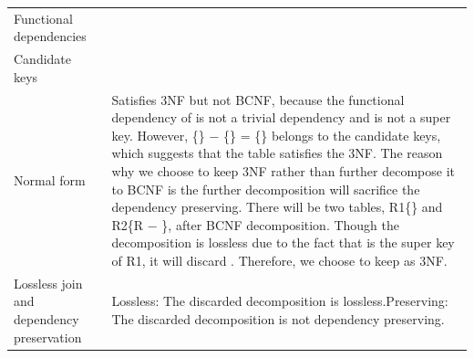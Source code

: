 \begin{xltabular}{\linewidth}{@{}KY@{}}
Functional dependencies & \begin{points}
  \item {}
  \item {}
  \item {}
  \item {}
  \item {}
  \item {}
  \item {}
  \item {}
  \item {}
\end{points} \\
Candidate keys & \begin{points}
  \item {}
  \item {}
  \item {}
\end{points} \\
Normal form & Satisfies 3NF but not BCNF, because the functional dependency of  is not a trivial dependency and  is not a super key. However, \{\} $-$ \{\} = \{\} belongs to the candidate keys, which suggests that the table satisfies the 3NF. The reason why we choose to keep 3NF rather than further decompose it to BCNF is the further decomposition will sacrifice the dependency preserving. There will be two tables, R1\{\} and R2\{R $-$ \}, after BCNF decomposition. Though the decomposition is lossless due to the fact that  is the super key of R1, it will discard . Therefore, we choose to keep as 3NF. \\
Lossless join and dependency preservation & Lossless: The discarded decomposition is lossless.\newline Preserving: The discarded decomposition is not dependency preserving. \\
\bottomrule
\end{xltabular}

